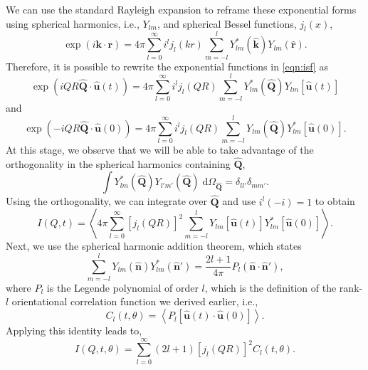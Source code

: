 \documentclass[reprint,
               superscriptaddress,
               nobibnotes,
               amsmath,
               amssymb,
               aps,
               hidelinks, 
               pre]{revtex4-2}
\begin{document}
We can use the standard Rayleigh expansion to reframe these exponential forms using spherical harmonics, i.e., $Y_{lm}$, and spherical Bessel functions, $j_l(x)$,
%
\begin{equation}
\exp{\left(i\mathbf{k}\cdot\mathbf{r}\right)} = 4\pi \sum_{l=0}^{\infty}i^l j_l(kr) \sum_{m=-l}^{l} Y_{lm}^*(\hat{\mathbf{k}})Y_{lm}(\hat{\mathbf{r}}).
\end{equation}
%
Therefore, it is possible to rewrite the exponential functions in \cref{eqn:isf} as
%
\begin{equation}
    \exp{\left(iQR\hat{\mathbf{Q}}\cdot\hat{\mathbf{u}}(t)\right)} =  4\pi \sum_{l=0}^{\infty}i^l j_l(QR) \sum_{m=-l}^l Y_{lm}^*(\hat{\mathbf{Q}})Y_{lm}\left[\hat{\mathbf{u}}(t)\right]
\end{equation}
%
and
%
\begin{equation}
    \exp{\left(-iQR\hat{\mathbf{Q}}\cdot\hat{\mathbf{u}}(0)\right)} = 4\pi \sum_{l=0}^{\infty}i^l j_l(QR) \sum_{m=-l}^l Y_{lm}(\hat{\mathbf{Q}})Y_{lm}^*\left[\hat{\mathbf{u}}(0)\right]. 
\end{equation}
%
At this stage, we observe that we will be able to take advantage of the orthogonality in the spherical harmonics containing $\hat{\mathbf{Q}}$, 
%
\begin{equation}
    \int Y_{lm}^*(\hat{\mathbf{Q}})Y_{l'm'}(\hat{\mathbf{Q}}) \;\textrm{d}\Omega_{\hat{\mathbf{Q}}} = \delta_{ll'}\delta_{mm'}. 
\end{equation}
%
Using the orthogonality, we can integrate over $\hat{\mathbf{Q}}$ and use $i^l(-i)=1$ to obtain
%
\begin{equation}
    I(Q, t) = \left\langle 4\pi
    \sum_{l=0}^{\infty}\left[j_l(QR)\right]^2 \sum_{m=-l}^l Y_{lm}\left[\hat{\mathbf{u}}(t)\right]Y_{lm}^*\left[\hat{\mathbf{u}}(0)\right]
    \right\rangle.
\end{equation}
%
Next, we use the spherical harmonic addition theorem, which states
%
\begin{equation}
    \sum_{m=-l}^l Y_{lm}\left(\hat{\mathbf{n}}\right)Y_{lm}^*\left(\hat{\mathbf{n}}'\right) = \frac{2l+1}{4\pi} P_l(\hat{\mathbf{n}}\cdot\hat{\mathbf{n}}'),
\end{equation}
%
where $P_l$ is the Legende polynomial of order $l$, which is the definition of the rank-$l$ orientational correlation function we derived earlier, i.e., 
%
\begin{equation}
    C_l(t, \theta) = \left\langle P_l\left[\hat{\mathbf{u}}(t)\cdot\hat{\mathbf{u}}(0)\right]\right\rangle.
\end{equation}
%
Applying this identity leads to, 
%
\begin{equation}
    I(Q, t, \theta) = \sum_{l=0}^{\infty}(2l+1) \left[j_l(QR)\right]^2 C_l(t, \theta).
    \label{eqn:isf2}
\end{equation}
%
\end{document}
